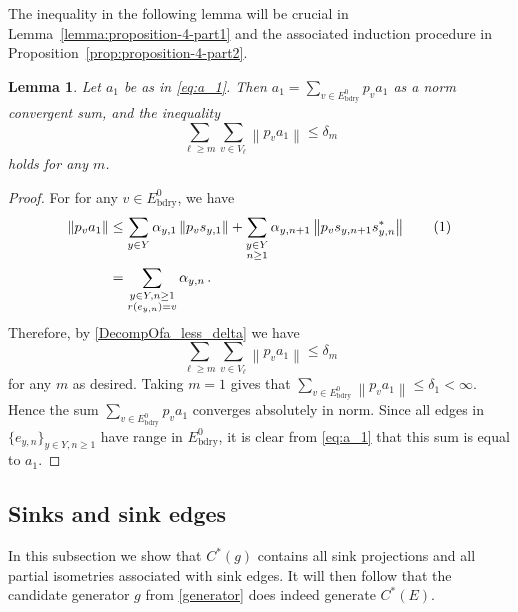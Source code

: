 \documentclass[12pt, a4paper]
{amsart}
\newcommand\numberthis{\addtocounter{equation}{1}\tag{\theequation}}
\newcommand{\norm}[1]{\left\|#1\right\|} %
\newtheorem{lemma}[thm]{Lemma}
\theoremstyle{definition}
\theoremstyle{remark}
\numberwithin{equation}{section}
\newcommand{\Eboundary}{E^0_{\mathrm{bdry}}}
\newcommand{\Cstar}{\ensuremath{C^*}}
\begin{document}
The inequality in the following lemma will be crucial in Lemma~\ref{lemma:proposition-4-part1} and the associated induction procedure in Proposition~\ref{prop:proposition-4-part2}.

\begin{lemma}\label{lemma:a_1}
    Let $a_1$ be as in \eqref{eq:a_1}. Then $a_1 = \sum_{v \in \Eboundary} p_v a_1$ as a norm convergent sum, and the inequality
    \begin{equation}\label{eq:decay-of-a_1}
    \sum_{\ell \ge m} \sum_{v \in V_\ell} \norm{p_v a_1} \le \delta_m
    \end{equation}
    holds for any $m$.
\end{lemma}

\begin{proof}
    For for any $v \in \Eboundary$, we have
    \begin{align*}
    \norm{p_v a_1}
    &\le \sum_{y\in Y} \alpha_{y,1} \norm{p_v s_{y,1}} + \sum_{\substack{y \in Y \\ n \ge 1}} \alpha_{y,n+1} \norm{p_vs_{y,n+1} s^*_{y,n}}\numberthis\\
    &= \sum_{\substack{y \in Y, n \ge 1\\ r(e_{y,n}) = v}} \alpha_{y,n}\,.
    \end{align*}
    Therefore, by \eqref{DecompOfa_less_delta} we have
    \begin{equation}
    \sum_{\ell \ge m} \sum_{v \in V_\ell} \norm{p_v a_1} \le \delta_m
    \end{equation}
    for any $m$ as desired. Taking $m = 1$ gives that $\sum_{v \in \Eboundary} \norm{p_v a_1} \le \delta_1 < \infty$. Hence the sum $\sum_{v \in \Eboundary} p_v a_1$ converges absolutely in norm. Since all edges in $\{e_{y,n}\}_{y \in Y, n \ge 1}$ have range in $\Eboundary$, it is clear from \eqref{eq:a_1} that this sum is equal to $a_1$.
\end{proof}



\subsection{Sinks and sink edges}\label{subsec:sinks}
In this subsection we show that $\Cstar(g)$ contains all sink projections and all partial isometries associated with sink edges. It will then follow that the candidate generator $g$ from \eqref{generator} does indeed generate $\Cstar(E)$.
\end{document}
